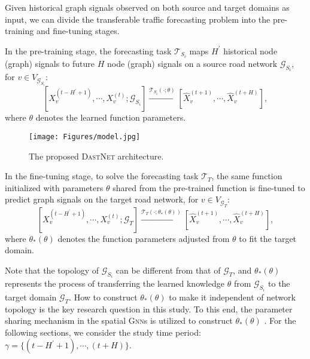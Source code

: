 \documentclass[sigconf]{acmart}
\theoremstyle{definition}
\begin{document}
\begin{definition}



Given historical graph signals observed on both source and target domains as input, we can divide the transferable traffic forecasting problem into the pre-training and fine-tuning stages.  





In the pre-training stage, the forecasting task $\mathcal{T}_{S_i}$ maps $H^{\prime}$ historical node (graph) signals to future $H$ node (graph) signals on a source road network $\mathcal{G}_{S_{i}}$, for $v \in V_{\mathcal{G}_{S_i}}$:\begin{equation}\label{eq1}
    \left[{X}^{\left(t-H^{\prime}+1\right)}_{v}, \cdots, {X}^{(t)}_{v} ; \mathcal{G}_{S_i}   \right] \stackrel{\mathcal{T}_{S_i}(\cdot;\theta)}{\longrightarrow}\left[\widehat{{X}}^{(t+1)}_{v}, \cdots, \widehat{{X}}^{(t+H)}_{v}\right],
\end{equation}
where $\theta$ denotes the learned function parameters.



\begin{figure*}[t]
    \centering
    \texttt{[image: Figures/model.jpg]}
    \caption{The proposed \textsc{DastNet} architecture.}
    \label{fig:model}
\end{figure*}

In the fine-tuning stage, to solve the forecasting task $\mathcal{T}_{T}$, the same function initialized with parameters $\theta$ shared from the pre-trained function is fine-tuned to predict graph signals on the target road network, for $v \in V_{\mathcal{G}_T}$:\begin{equation}\label{eq2}
    \left[{X}^{\left(t-H^{\prime}+1\right)}_{v}, \cdots, {X}^{(t)}_{v};  \mathcal{G}_{T}\right] \stackrel{\mathcal{T}_{T}\left(\cdot;\theta_*(\theta) \right)}{\longrightarrow}\left[\widehat{{X}}^{(t+1)}_{v}, \cdots, \widehat{{X}}^{(t+H)}_{v}\right],
\end{equation}
where $\theta_*(\theta)$ denotes the function parameters adjusted from $\theta$ to fit the target domain. 
\end{definition}
Note that the topology of $\mathcal{G}_{S_i}$ can be different from that of $\mathcal{G}_{T}$, and $\theta_*(\theta)$ represents the process of transferring the learned knowledge $\theta$ from $\mathcal{G}_{S_i}$ to the target domain $\mathcal{G}_{T}$. How to construct $\theta_*(\theta)$ to make it independent of network topology is the key research question in this study. To this end, the parameter sharing mechanism in the spatial \textsc{Gnn}s is utilized to construct $\theta_*(\theta)$ \cite{zhou2020graph}. For the following sections, we consider the study time period: $\gamma=\{(t-H^{\prime}+1),\cdots,(t+H)\}$. 
\end{document}
